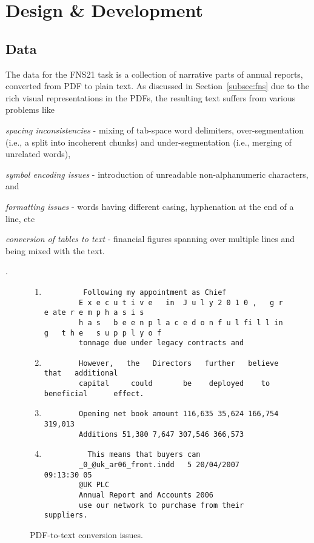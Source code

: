 \section{Design \& Development}\label{sec:design-and-development}

\subsection{Data}\label{subsec:data}
The data for the FNS21 task is a collection of narrative parts of annual reports, converted from PDF to plain text.
As discussed in Section~\ref{subsec:fns} due to the rich visual representations in the PDFs, the resulting text suffers from various problems like
\begin{enumerate*}
    \item \emph{spacing inconsistencies} - mixing of tab-space word delimiters, over-segmentation (i.e., a split into incoherent chunks) and under-segmentation (i.e., merging of unrelated words),
    \item \emph{symbol encoding issues} - introduction of unreadable non-alphanumeric characters, and
    \item \emph{formatting issues} - words having different casing, hyphenation at the end of a line, etc
    \item \emph{conversion of tables to text} - financial figures spanning over multiple lines and being mixed with the text.
\end{enumerate*}.

\begin{figure}[ht]
    \centering
    \begin{enumerate}
        \item \begin{verbatim}
         Following my appointment as Chief
        E x e c u t i v e	in	J u l y	2 0 1 0 ,	g r e ate r	e m p h a s i s
        h a s	b e e n	p l a c e d	o n	f u l fi l l in g	t h e	s u p p l y	o f
        tonnage due under legacy contracts and
    \end{verbatim}
    \item \begin{verbatim}
        However,   the   Directors   further   believe   that   additional
        capital   	could   	be	  deployed	  to 	beneficial   	effect.
    \end{verbatim}
    \item \begin{verbatim}
        Opening net book amount 116,635 35,624 166,754 319,013
        Additions 51,380 7,647 307,546 366,573
    \end{verbatim}
    \item \begin{verbatim}
          This means that buyers can
        _0_@uk_ar06_front.indd   5 20/04/2007   09:13:30 05
        @UK PLC
        Annual Report and Accounts 2006
        use our network to purchase from their suppliers.
    \end{verbatim}
    \end{enumerate}
    \caption{PDF-to-text conversion issues.}
    \label{fig:pdf_to_text}
\end{figure}

